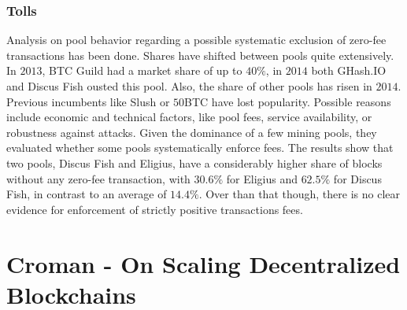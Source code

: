 \documentclass[USenglish]{uit-thesis}
\begin{document}
\subsubsection{Tolls}
Analysis on pool behavior regarding a possible systematic
exclusion of zero-fee transactions has been done.
Shares have shifted between pools quite extensively.
In $2013$, BTC Guild had a market share of up to $40\%$,
in $2014$ both GHash.IO and Discus Fish ousted this pool.
Also, the share of other pools has risen in $2014$. Previous
incumbents like Slush or $50$BTC have lost popularity.
Possible reasons include economic and technical factors,
like pool fees, service availability, or robustness against
attacks. Given the dominance of a few mining pools, they
evaluated whether some pools systematically enforce fees.
The results show that two pools, Discus Fish and Eligius,
have a considerably higher share of blocks without any
zero-fee transaction, with $30.6\%$ for Eligius and $62.5\%$
for Discus Fish, in contrast to an average of $14.4\%$.
Over than that though, there is no clear evidence for
enforcement of strictly positive transactions fees.
 
\section{Croman - On Scaling Decentralized Blockchains}
\label{sec:croman}
\end{document}
